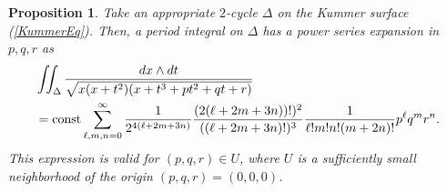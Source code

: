 \documentclass[10pt]{article}
\newtheorem{prop}{Proposition}[section]
\begin{document}
\begin{prop}\label{PropSer}
Take an appropriate $2$-cycle $\Delta$ on the Kummer surface (\ref{KummerEq}).
Then, a period integral on $\Delta$ has a power series expansion in $p,q,r$ as
\begin{align}\label{KummerPerSer}
&\iint_\Delta \frac{dx \wedge dt}{ \sqrt{x(x+t^2) (x+t^3+p t^2 +q t +r)}} \notag \\
&={\rm const}\sum_{\ell,m,n=0}^\infty \frac{1}{2^{4 (\ell + 2 m + 3 n)}} \frac{(2 (\ell + 2 m + 3 n) )!)^2}{((\ell + 2 m + 3 n)!)^3} \frac{1}{\ell! m! n! (m + 2 n)!} p^\ell q^m r^n.
\end{align}
This expression is valid for $(p,q,r) \in U$,
where $U$ is a sufficiently small neighborhood of the origin $(p,q,r)=(0,0,0)$.  
\end{prop}
\end{document}
